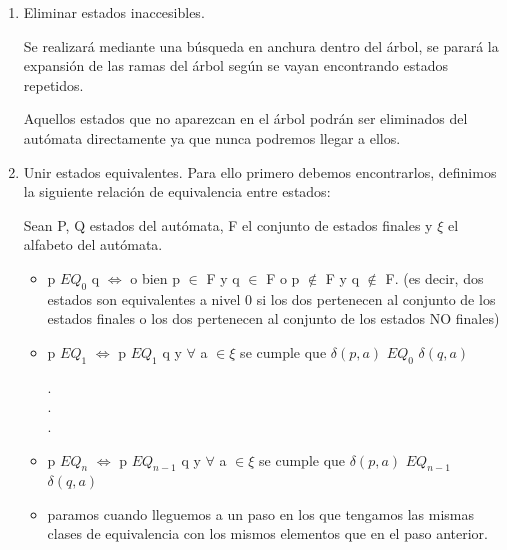 \documentclass{apuntes}
\begin{document}
\begin{enumerate}
\item Eliminar estados inaccesibles.

Se realizará mediante una búsqueda en anchura dentro del árbol, se parará la expansión de las ramas del árbol según se vayan encontrando estados repetidos.

Aquellos estados que no aparezcan en el árbol podrán ser eliminados del autómata directamente ya que nunca podremos llegar a ellos.

\item Unir estados equivalentes. Para ello primero debemos encontrarlos, definimos la siguiente relación de equivalencia entre estados:

Sean P, Q estados del autómata, F el conjunto de estados finales y $\xi$ el alfabeto del autómata.

\begin{itemize}
\item p $EQ_0$ q  $\Longleftrightarrow$ o bien p $\in$ F y q $\in$ F o p $\notin$ F y q $\notin$ F. (es decir, dos estados son equivalentes a nivel 0 si los dos pertenecen al conjunto de los estados finales o los dos pertenecen al conjunto de los estados NO finales)

\item p $EQ_1$ $\Longleftrightarrow$ p $EQ_1$ q y $\forall$ a $\in \xi$ se cumple que $\delta(p,a)$ $EQ_0$ $\delta(q,a)$

.\\
.\\
.
\item p $EQ_n$ $\Longleftrightarrow$ p $EQ_{n-1}$ q y $\forall$ a $\in \xi$ se cumple que $\delta(p,a)$ $EQ_{n-1}$ $\delta(q,a)$
\item paramos cuando lleguemos a un paso en los que tengamos las mismas clases de equivalencia con los mismos elementos que en el paso anterior.

\end{itemize}
\end{enumerate}
\end{document}
